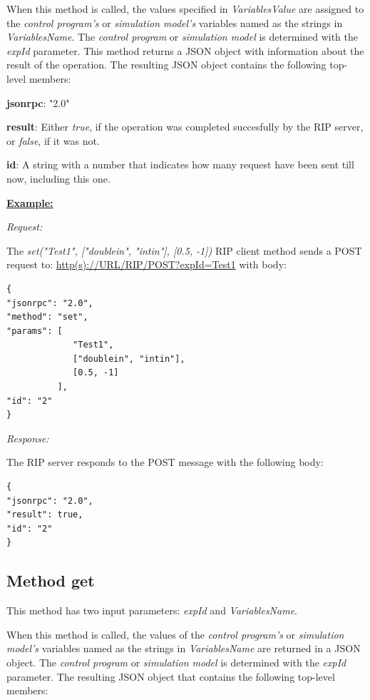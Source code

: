 When this method is called, the values specified in \textit{VariablesValue} are assigned to the \textit{control program's} or \textit{simulation model's} variables named as the strings in \textit{VariablesName}. The \textit{control program} or \textit{simulation model} is determined with the \textit{expId} parameter. This method returns a JSON object with information about the result of the operation. The resulting JSON object contains the following top-level members:

\begin{myEnumerate}
    \item \textbf{jsonrpc}: "2.0"
    \item \textbf{result}: Either \textit{true}, if the operation was completed succesfully by the RIP server, or \textit{false}, if it was not.
    \item \textbf{id}: A string with a number that indicates how many request have been sent till now, including this one.
\end{myEnumerate}

\textbf{\underline{Example:}}

\textit{Request:}

The \textit{set("Test1", ["doublein", "intin"], [0.5, -1])} RIP client method sends a POST request to: \url{http(s)://URL/RIP/POST?expId=Test1} with body:

\begin{lstlisting}
{
"jsonrpc": "2.0",
"method": "set",
"params": [
	         "Test1",
	         ["doublein", "intin"],
	         [0.5, -1]
          ],
"id": "2"
}
\end{lstlisting}

\textit{Response:}

The RIP server responds to the POST message with the following body:

\begin{lstlisting}
{
"jsonrpc": "2.0",
"result": true,
"id": "2"
}
\end{lstlisting}

\subsection{Method get}
This method has two input parameters: \textit{expId} and \textit{VariablesName}.

When this method is called, the values of the \textit{control program's} or \textit{simulation model's} variables named as the strings in \textit{VariablesName} are returned in a JSON object. The \textit{control program} or \textit{simulation model} is determined with the \textit{expId} parameter. The resulting JSON object that contains the following top-level members:

